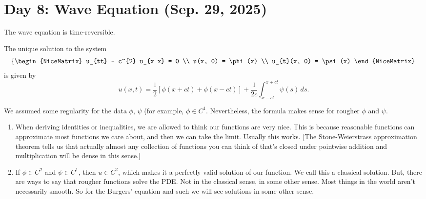\section{Day 8: Wave Equation (Sep. 29, 2025)}

The wave equation is time-reversible.
\begin{theorem}
	The unique solution to the system
	\[ \left\{\begin{NiceMatrix}
		u_{tt} - c^{2} u_{x x} = 0 \\
		u(x, 0) = \phi(x) \\
		u_{t}(x, 0) = \psi(x) 
	\end{NiceMatrix}\right. \]
	is given by
	\[ u(x, t) = \frac{1}{2} \left[ \phi(x + ct) + \phi(x - ct) \right] + \frac{1}{2c} \int_{x-ct}^{x+ct} \psi(s) \, ds. \]
\end{theorem}

\begin{remark}
	We assumed some regularity for the data \( \phi \), \( \psi \) (for example, \( \phi \in C^{1} \). Nevertheless, the formula makes sense for rougher \( \phi \) and \( \psi \).
\end{remark}

\begin{remark}

	\begin{enumerate}
	
		\item When deriving identities or inequalities, we are allowed to think our functions are very nice. This is because reasonable functions can approximate most functions we care about, and then we can take the limit. Usually this works. [The Stone-Weierstrass approximation theorem tells us that actually almost any collection of functions you can think of that's closed under pointwise addition and multiplication will be dense in this sense.]

		\item If \( \phi \in C^{2} \) and \( \psi \in C^{1} \), then \( u \in C^{2} \), which makes it a perfectly valid solution of our function. We call this a classical solution. But, there are ways to say that rougher functions solve the PDE\@. Not in the classical sense, in some other sense. Most things in the world aren't necessarily smooth. So for the Burgers' equation and such we will see solutions in some other sense.
	
	\end{enumerate}
	
\end{remark}

